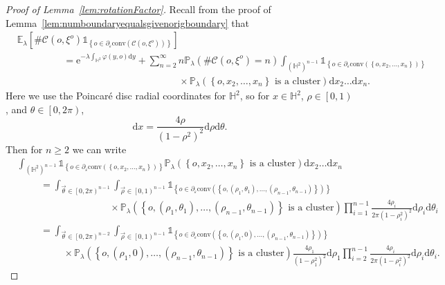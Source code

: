 \documentclass[10pt,a4paper,dvipsnames]{article}
\theoremstyle{definition}
\theoremstyle{remark}
\newcommand{\pla}{\mathbb P_\lambda}
\newcommand{\ela}{\mathbb E_{\lambda}}
\newcommand{\HypTwo}{{\mathbb{H}^2}}
\newcommand{\dd}{\mathrm{d}} %
\newcommand{\C}{\mathscr {C}}
\newcommand{\convex}[1]{{\mathrm{conv}\left(#1\right)}}
\newcommand{\Id}{\mathds 1}
\newcommand{\orig}{o}
\newcommand{\e}{\mathrm{e}}
\newcommand{\connf}{\varphi}
\numberwithin{equation}{section}
\begin{document}
\begin{proof}[Proof of Lemma~\ref{lem:rotationFactor}]
    Recall from the proof of Lemma~\ref{lem:numboundaryequalsgivenorigboundary} that
    \begin{align}
        &\ela\left[\#\C\left(\orig,\xi^{\orig}\right)\Id_{\left\{\orig\in\partial_\varepsilon\convex{\C\left(\orig,\xi^{\orig}\right)}\right\}}\right] \nonumber\\
        &\hspace{2cm}=\e^{-\lambda\int_\HypTwo\connf(y,\orig)\dd y} + \sum_{n=2}^\infty n\pla\left(\#\C\left(\orig,\xi^\orig\right)=n\right)\int_{\left(\HypTwo\right)^{n-1}}\Id_{\left\{\orig\in\partial_{\varepsilon}\convex{\left\{\orig,x_2,\ldots,x_n\right\}}\right\}}\nonumber\\
        &\hspace{7cm}\times\pla\left(\left\{\orig,x_2,\ldots,x_n\right\}\text{ is a cluster}\right)\dd x_2\ldots \dd x_n.
    \end{align}
    Here we use the Poincar{\'e} disc radial coordinates for $\HypTwo$, so for $x\in\HypTwo$, $\rho\in\left[0,1\right)$, and $\theta\in\left[0,2\pi\right)$,
    \begin{equation}
        \dd x = \frac{4\rho}{\left(1-\rho^2\right)^2}\dd\rho\dd\theta.
    \end{equation}
    Then for $n\geq 2$ we can write
    \begin{align}
        &\int_{\left(\HypTwo\right)^{n-1}}\Id_{\left\{\orig\in\partial_{\varepsilon}\convex{\left\{\orig,x_2,\ldots,x_n\right\}}\right\}}\pla\left(\left\{\orig,x_2,\ldots,x_n\right\}\text{ is a cluster}\right)\dd x_2\ldots \dd x_n\nonumber\\
        & \hspace{1cm}= \int_{\vec{\theta}\in\left[0,2\pi\right)^{n-1}}\int_{\vec{\rho}\in\left[0,1\right)^{n-1}} \Id_{\left\{\orig\in\partial_{\varepsilon}\convex{\left\{\orig,\left(\rho_1,\theta_{1}\right),\ldots,\left(\rho_{n-1},\theta_{n-1}\right)\right\}}\right\}}\nonumber\\
        &\hspace{4cm}\times\pla\left(\left\{\orig,\left(\rho_1,\theta_{1}\right),\ldots,\left(\rho_{n-1},\theta_{n-1}\right)\right\}\text{ is a cluster}\right)\prod^{n-1}_{i=1}\frac{4\rho_i}{2\pi\left(1-\rho_i^2\right)^2}\dd \rho_i\dd\theta_i\nonumber\\
        & \hspace{1cm}= \int_{\vec{\theta}\in\left[0,2\pi\right)^{n-2}}\int_{\vec{\rho}\in\left[0,1\right)^{n-1}} \Id_{\left\{\orig\in\partial_{\varepsilon}\convex{\left\{\orig,\left(\rho_1,0\right),\ldots,\left(\rho_{n-1},\theta_{n-1}\right)\right\}}\right\}}\nonumber\\
        &\hspace{2cm}\times\pla\left(\left\{\orig,\left(\rho_1,0\right),\ldots,\left(\rho_{n-1},\theta_{n-1}\right)\right\}\text{ is a cluster}\right)\frac{4\rho_1}{\left(1-\rho_1^2\right)^2}\dd\rho_1\prod^{n-1}_{i=2}\frac{4\rho_i}{2\pi\left(1-\rho_i^2\right)^2}\dd \rho_i\dd\theta_i.
    \end{align}


\end{proof}
\end{document}
